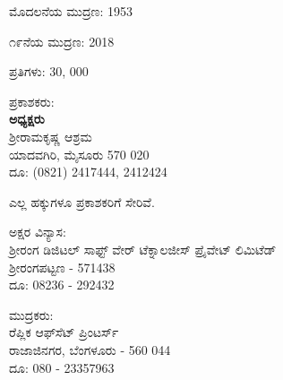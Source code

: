 \thispagestyle{empty}

\begin{flushleft}
ಮೊದಲನೆಯ ಮುದ್ರಣ: 1953
\end{flushleft}

\vfill

\begin{flushleft}
೧೯ನೆಯ ಮುದ್ರಣ: 2018
\end{flushleft}

\vfill

\begin{flushleft}
ಪ್ರತಿಗಳು: 30, 000
\end{flushleft}

\vfill


\vfill

\begin{flushleft}
ಪ್ರಕಾಶಕರು:\\\textbf{ಅಧ್ಯಕ್ಷರು}\\ಶ‍್ರೀರಾಮಕೃಷ್ಣ ಆಶ್ರಮ\\ಯಾದವಗಿರಿ, ಮೈಸೂರು 570 020\\ದೂ: (0821) 2417444, 2412424
\end{flushleft}

\vfill

\begin{flushleft}
 ಎಲ್ಲ ಹಕ್ಕುಗಳೂ ಪ್ರಕಾಶಕರಿಗೆ ಸೇರಿವೆ.
\end{flushleft}

\vfill

\begin{flushleft}{\small
ಅಕ್ಷರ ವಿನ್ಯಾಸ:\\ಶ‍್ರೀರಂಗ ಡಿಜಿಟಲ್ ಸಾಫ್ಟ್ ‍ವೇರ್ ಟೆಕ್ನಾಲಜೀಸ್ ಪ್ರೈವೇಟ್ ಲಿಮಿಟೆಡ್\\ಶ‍್ರೀರಂಗಪಟ್ಟಣ - 571438\\ದೂ: 08236 - 292432
}\end{flushleft}

\vfill

\begin{flushleft}{\small
ಮುದ್ರಕರು:\\ರೆಪ್ಲಿಕ ಆಫ್‍ಸೆಟ್ ಪ್ರಿಂಟರ್ಸ್\\ರಾಜಾಜಿನಗರ, ಬೆಂಗಳೂರು - 560 044\\ದೂ: 080 - 23357963
}\end{flushleft}


